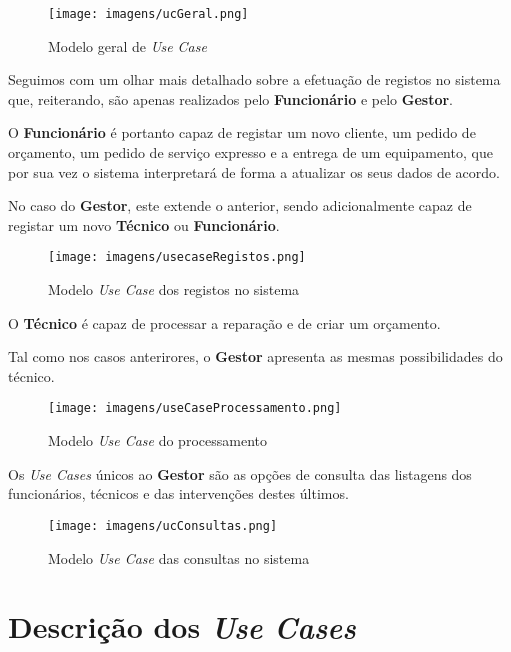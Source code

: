 \documentclass{article}
\begin{document}
\begin{figure}[H]
    \centering
    \texttt{[image: imagens/ucGeral.png]}
    \caption{Modelo geral de \textit{Use Case}}
\end{figure}

\par Seguimos com um olhar mais detalhado sobre a efetuação de registos no sistema que, reiterando, são apenas realizados pelo \textbf{Funcionário} e pelo \textbf{Gestor}.
\par O \textbf{Funcionário} é portanto capaz de registar um novo cliente, um pedido de orçamento, um pedido de serviço expresso e a entrega de um equipamento, que por sua vez o sistema interpretará de forma a atualizar os seus dados de acordo.
\par No caso do \textbf{Gestor}, este extende o anterior, sendo adicionalmente capaz de registar um novo \textbf{Técnico} ou \textbf{Funcionário}.

\begin{figure}[H]
    \centering
    \texttt{[image: imagens/usecaseRegistos.png]}
    \caption{Modelo \textit{Use Case} dos registos no sistema}
\end{figure}

\par O \textbf{Técnico} é capaz de processar a reparação e de criar um orçamento. 
\par Tal como nos casos anterirores, o \textbf{Gestor} apresenta as mesmas possibilidades do técnico.

\begin{figure}[H]
    \centering
    \texttt{[image: imagens/useCaseProcessamento.png]}
    \caption{Modelo \textit{Use Case} do processamento}
\end{figure}

\par Os \textit{Use Cases} únicos ao \textbf{Gestor} são as opções de consulta das listagens dos funcionários, técnicos e das intervenções destes últimos. 

\begin{figure}[H]
    \centering
    \texttt{[image: imagens/ucConsultas.png]}
    \caption{Modelo \textit{Use Case} das consultas no sistema}
\end{figure}


\pagebreak


\section{Descrição dos \textit{Use Cases}}
\end{document}

